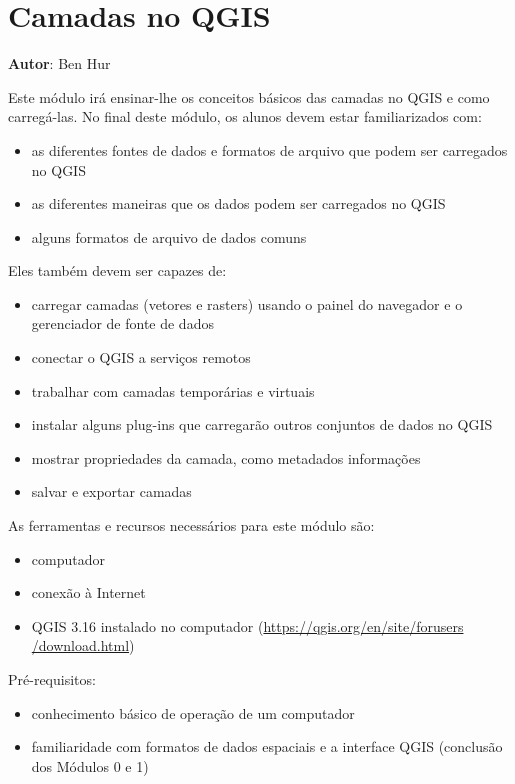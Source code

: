 \documentclass[
]{krantz}
\providecommand{\tightlist}{%
  \setlength{\itemsep}{0pt}\setlength{\parskip}{0pt}}
\begin{document}
\hypertarget{camadas-no-qgis}{%
\chapter{Camadas no QGIS}\label{camadas-no-qgis}}

\textbf{Autor}: Ben Hur

Este módulo irá ensinar-lhe os conceitos básicos das camadas no QGIS e como carregá-las. No final deste módulo, os alunos devem estar familiarizados com:

\begin{itemize}
\tightlist
\item
  as diferentes fontes de dados e formatos de arquivo que podem ser carregados no QGIS
\item
  as diferentes maneiras que os dados podem ser carregados no QGIS
\item
  alguns formatos de arquivo de dados comuns
\end{itemize}

Eles também devem ser capazes de:

\begin{itemize}
\tightlist
\item
  carregar camadas (vetores e rasters) usando o painel do navegador e o gerenciador de fonte de dados
\item
  conectar o QGIS a serviços remotos
\item
  trabalhar com camadas temporárias e virtuais
\item
  instalar alguns plug-ins que carregarão outros conjuntos de dados no QGIS
\item
  mostrar propriedades da camada, como metadados informações
\item
  salvar e exportar camadas
\end{itemize}

As ferramentas e recursos necessários para este módulo são:

\begin{itemize}
\tightlist
\item
  computador
\item
  conexão à Internet
\item
  QGIS 3.16 instalado no computador (\href{https://qgis.org/en/site/forusers/download.html}{https://qgis.org/en/site/forusers /download.html})
\end{itemize}

Pré-requisitos:

\begin{itemize}
\tightlist
\item
  conhecimento básico de operação de um computador
\item
  familiaridade com formatos de dados espaciais e a interface QGIS (conclusão dos Módulos 0 e 1)
\end{itemize}
\end{document}
